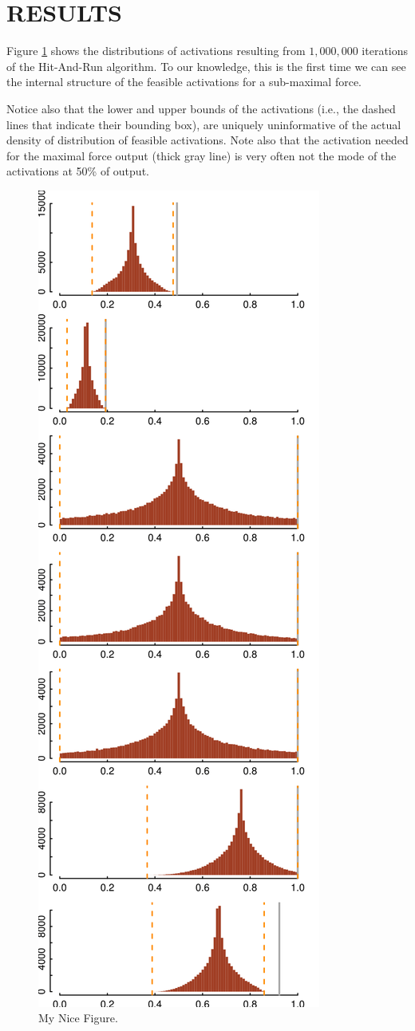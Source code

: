 \section{RESULTS}

Figure \ref{fig:raw_histograms} shows the distributions of activations resulting from $1,000,000$ iterations of the Hit-And-Run algorithm. To our knowledge, this is the first time we can see the internal structure of the feasible activations for a sub-maximal force.

Notice also that the lower and upper bounds of the activations (i.e., the dashed lines that indicate their bounding box), are uniquely uninformative of the actual density of distribution of feasible activations. Note also that the activation needed for the maximal force output (thick gray line) is very often not the mode of the activations at 50\% of output.

\begin{figure}[htbp]
\centering
\includegraphics[width=7.5cm\textwidth]{sections/figs/raw_histograms.png}
\caption{My Nice Figure.}
\label{fig:raw_histograms}
\end{figure}
